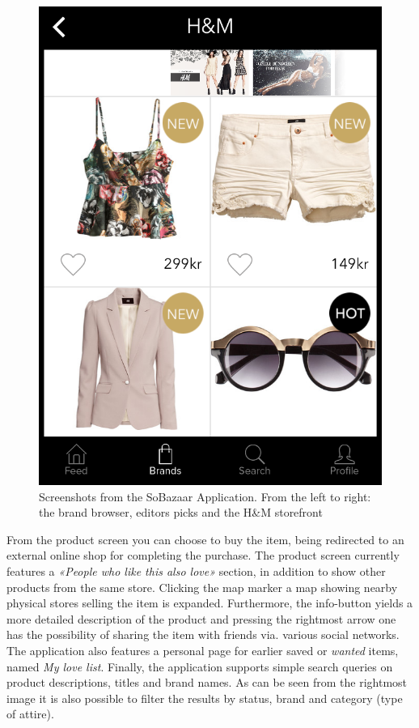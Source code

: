 \begin{figure}[H]
\begin{minipage}{.3\linewidth}
      \includegraphics[height=1.5\linewidth]{image/SoBazaarStore.png}
  \end{minipage}
  \caption[SoBazaar storefront screenshots - version 0.5.1]{Screenshots from the SoBazaar Application. From the left to right: the brand browser, editors picks and the H\&M storefront}
  \label{figure:SoBazaarfeed2}
\end{figure}

From the product screen you can choose to buy the item, being redirected to an
external online shop for completing the purchase. The product screen currently
features a \emph{«People who like this also love»} section, in addition to show
other products from the same store. Clicking the map marker a map showing
nearby physical stores selling the item is expanded. Furthermore, the
info-button yields a more detailed description of the product and pressing the
rightmost arrow one has the possibility of sharing the item with friends via.
various social networks. The application also features a personal page for
earlier saved or \emph{wanted} items, named \textit{My love list}. Finally, the
application supports simple search queries on product descriptions, titles and
brand names. As can be seen from the rightmost image it is also possible to
filter the results by status, brand and category (type of attire).

